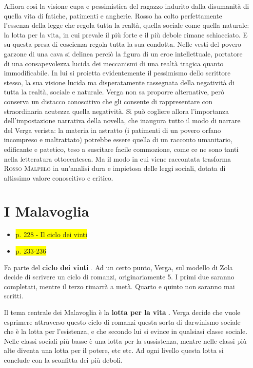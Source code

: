 \documentclass{book}
\newcommand{\pagine}[1]{\colorbox{yellow}{#1}}
\newcommand{\evidenziatore}[1]{\textbf{#1}}
\newcounter{mar}
\begin{document}
Affiora così la visione cupa e pessimistica del ragazzo indurito dalla disumanità di quella vita di fatiche, patimenti e angherie. Rosso ha colto perfettamente l'essenza della legge che regola tutta la realtà, quella sociale come quella naturale: la lotta per la vita, in cui prevale il più forte e il più debole rimane schiacciato. E su questa presa di coscienza regola tutta la sua condotta. Nelle vesti del povero garzone di una cava si delinea perciò la figura di un eroe intellettuale, portatore di una consapevolezza lucida dei meccanismi di una realtà tragica quanto immodificabile.  In lui si proietta evidentemente il pessimismo dello scrittore stesso, la sua visione lucida ma disperatamente rassegnata della negatività di tutta la realtà, sociale e naturale. Verga non sa proporre alternative, però conserva un distacco conoscitivo che gli consente di rappresentare con straordinaria acutezza quella negatività. Si può cogliere allora l'importanza dell'impostazione narrativa della novella, che inaugura tutto il modo di narrare del Verga verista: la materia in astratto (i patimenti di un povero orfano incompreso e maltrattato) potrebbe essere quella di un racconto umanitario, edificante e patetico, teso a suscitare facile commozione, come ce ne sono tanti nella letteratura ottocentesca. Ma il modo in cui viene raccontata trasforma \textsc{Rosso Malpelo} in un'analisi dura e impietosa delle leggi sociali, dotata di altissimo valore conoscitivo e critico.

\section{I Malavoglia}

\begin{itemize}
\item
  \pagine{p. 228 - Il ciclo dei vinti}
\item
  \pagine{p. 233-236}
\end{itemize}

Fa parte del \evidenziatore{ciclo dei vinti} . Ad un certo punto, Verga,
sul modello di Zola decide di scrivere un ciclo di romanzi,
originariamente 5. I primi due saranno completati, mentre il terzo
rimarrà a metà. Quarto e quinto non saranno mai scritti.

Il tema centrale dei Malavoglia è la \evidenziatore{lotta per la vita} .
Verga decide che vuole esprimere attraverso questo ciclo di romanzi
questa sorta di darwinismo sociale che è la lotta per l'esistenza, e che
secondo lui si evince in qualsiasi classe sociale. Nelle classi sociali
più basse è una lotta per la sussistenza, mentre nelle classi più alte
diventa una lotta per il potere, etc etc. Ad ogni livello questa lotta
si conclude con la sconfitta dei più deboli.
\end{document}

